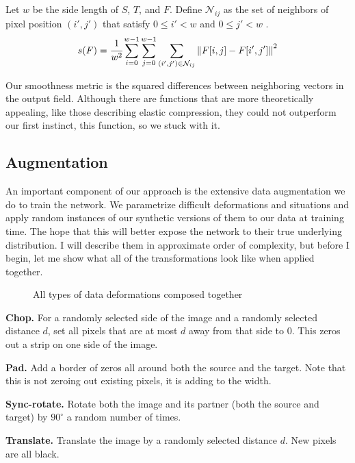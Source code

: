 \documentclass[12pt,a4paper]{article}
\begin{document}
Let $w$ be the side length of $S$, $T$, and $F$. Define $\mathcal{N}_{ij}$ as the set of neighbors of pixel position $(i',j')$ that satisfy $0 \leq i' < w$ and $0 \leq j' < w$ .
$$ s(F) = \cfrac{1}{w^2} \sum\limits_{i=0}^{w-1} \sum\limits_{j=0}^{w-1} \sum\limits_{(i', j') \in \mathcal{N}_{ij}} \left\| F[i,j] - F[i',j'] \right\| ^2 $$

Our smoothness metric is the squared differences between neighboring vectors in the output field. Although there are functions that are more theoretically appealing, like those describing elastic compression, they could not outperform our first instinct, this function, so we stuck with it. 

\subsection{Augmentation}

An important component of our approach is the extensive data augmentation we do to train the network. We parametrize difficult deformations and situations and apply random instances of our synthetic versions of them to our data at training time. The hope that this will better expose the network to their true underlying distribution. I will describe them in approximate order of complexity, but before I begin, let me show what all of the transformations look like when applied together.

\begin{figure}[ht]%
    \centering
	\qquad
    \caption{All types of data deformations composed together}%
\end{figure}

{\bf Chop.} For a randomly selected side of the image and a randomly selected distance $d$, set all pixels that are at most $d$ away from that side to $0$. This zeros out a strip on one side of the image.

{\bf Pad.} Add a border of zeros all around both the source and the target. Note that this is not zeroing out existing pixels, it is adding to the width.

{\bf Sync-rotate.} Rotate both the image and its partner (both the source and target) by $90^{\circ}$ a random number of times.  

{\bf Translate.} Translate the image by a randomly selected distance $d$. New pixels are all black.
\end{document}
